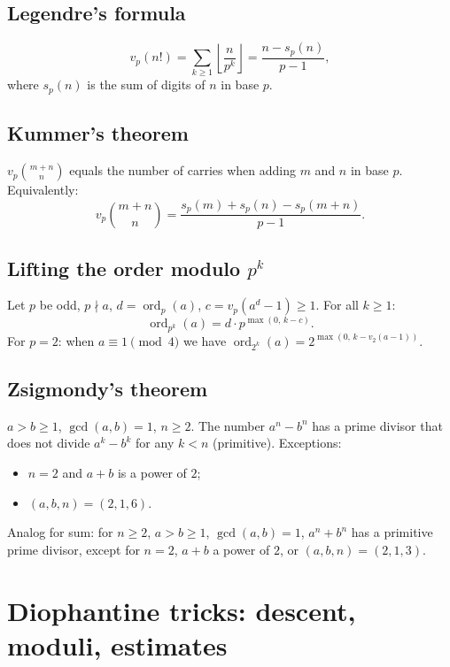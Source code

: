 \subsection{Legendre's formula}
\label{subsec:legendre}

$$v_p(n!)=\sum_{k\ge1}\left\lfloor\frac{n}{p^k}\right\rfloor=\frac{n-s_p(n)}{p-1},$$
where $s_p(n)$ is the sum of digits of $n$ in base $p$.

\subsection{Kummer's theorem}
\label{subsec:kummer}

$v_p\binom{m+n}{n}$ equals the number of carries when adding $m$ and $n$ in base $p$. Equivalently:
$$v_p\binom{m+n}{n}=\frac{s_p(m)+s_p(n)-s_p(m+n)}{p-1}.$$

\subsection{Lifting the order modulo $p^k$}
\label{subsec:lift-order}

Let $p$ be odd, $p\nmid a$, $d=\operatorname{ord}_p(a)$, $c=v_p(a^d-1)\ge1$. For all $k\ge1$:
$$\operatorname{ord}_{p^k}(a)=d\cdot p^{\max(0,\,k-c)}.$$
For $p=2$: when $a\equiv1\pmod4$ we have $\operatorname{ord}_{2^k}(a)=2^{\max(0,\,k-v_2(a-1))}$.

\subsection{Zsigmondy's theorem}
\label{subsec:zsigmondy}

$a>b\ge1$, $\gcd(a,b)=1$, $n\ge2$. The number $a^n-b^n$ has a prime divisor that does not divide $a^k-b^k$ for any $k<n$ (primitive). Exceptions:
\begin{itemize}
\item $n=2$ and $a+b$ is a power of $2$;
\item $(a,b,n)=(2,1,6)$.
\end{itemize}

Analog for sum: for $n\ge2$, $a>b\ge1$, $\gcd(a,b)=1$, $a^n+b^n$ has a primitive prime divisor, except for $n=2$, $a+b$ a power of $2$, or $(a,b,n)=(2,1,3)$.

\medskip

\section{Diophantine tricks: descent, moduli, estimates}

